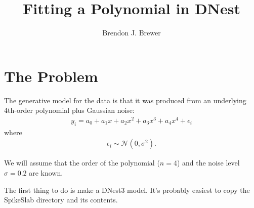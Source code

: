 \documentclass[letterpaper, 11pt]{article}
\title{Fitting a Polynomial in DNest}
\author{Brendon J. Brewer}
\begin{document}
\maketitle


\section{The Problem}
The generative model for the data is that it was produced from an underlying
4th-order polynomial plus Gaussian noise:
\begin{eqnarray}
y_i = a_0 + a_1 x + a_2 x^2 + a_3 x^3 + a_4 x^4 + \epsilon_i
\end{eqnarray}
where
\begin{eqnarray}
\epsilon_i \sim \mathcal{N}(0, \sigma^2).
\end{eqnarray}

We will assume that the order of the polynomial ($n=4$) and the noise level
$\sigma=0.2$ are known.

The first thing to do is make a DNest3 model. It's probably easiest to copy
the SpikeSlab directory and its contents.
\end{document}
